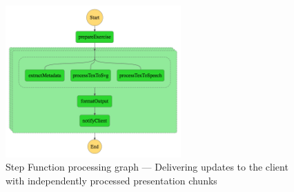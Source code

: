 \begin{figure}[H]
    \centering
    \includegraphics[width=0.6\textwidth]{assets/04-serverless-for-web-apps/stepFunctionGraphInitialBatch.png}
    \caption{Step Function processing graph --- Delivering updates to the client with independently processed presentation chunks}
    \label{fig:step-function-pushing-updates-to-the-client-with-partially-processed-presentation}
\end{figure}

\datasetUploadInitialBatch

